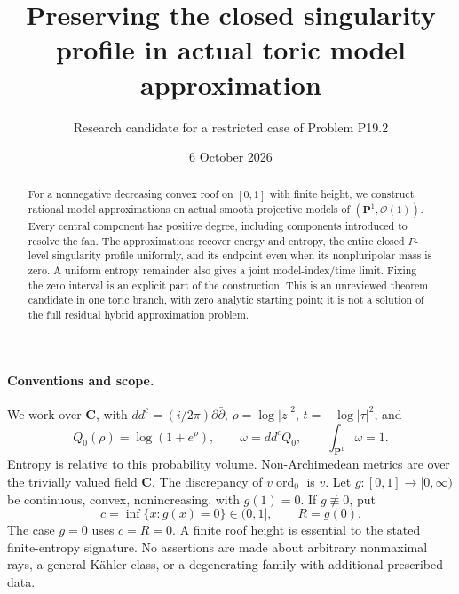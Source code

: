 \documentclass[11pt]{article}
\title{Preserving the closed singularity profile in actual toric model approximation}
\author{Research candidate for a restricted case of Problem P19.2}
\date{6 October 2026}
\newcommand{\PP}{\mathbf P}
\begin{document}
\maketitle
\begin{abstract}
For a nonnegative decreasing convex roof on $[0,1]$ with finite height,
we construct rational model approximations on actual smooth projective
models of $(\PP^1,\mathcal O(1))$. Every central component has positive
degree, including components introduced to resolve the fan. The
approximations recover energy and entropy, the entire closed $P$-level
singularity profile uniformly, and its endpoint even when its
nonpluripolar mass is zero. A uniform entropy remainder also gives a
joint model-index/time limit. Fixing the zero interval is an explicit
part of the construction. This is an unreviewed theorem candidate in
one toric branch, with zero analytic starting point; it is not a solution
of the full residual hybrid approximation problem.
\end{abstract}

\paragraph{Conventions and scope.}
We work over $\mathbf C$, with
$dd^c=(i/2\pi)\partial\bar\partial$,
$\rho=\log|z|^2$, $t=-\log|\tau|^2$, and
\[
 Q_0(\rho)=\log(1+e^\rho),\qquad
 \omega=dd^c Q_0,\qquad \int_{\PP^1}\omega=1.
\]
Entropy is relative to this probability volume. Non-Archimedean
metrics are over the trivially valued field $\mathbf C$.
The discrepancy of $v\operatorname{ord}_0$ is $v$.
Let $g:[0,1]\to[0,\infty)$ be continuous, convex, nonincreasing,
with $g(1)=0$. If $g\not\equiv0$, put
\[
 c=\inf\{x:g(x)=0\}\in(0,1],\qquad R=g(0).
\]
The case $g=0$ uses $c=R=0$. A finite roof height is essential to
the stated finite-entropy signature. No assertions are made about
arbitrary nonmaximal rays, a general K\"ahler class, or a degenerating
family with additional prescribed data.
\end{document}

